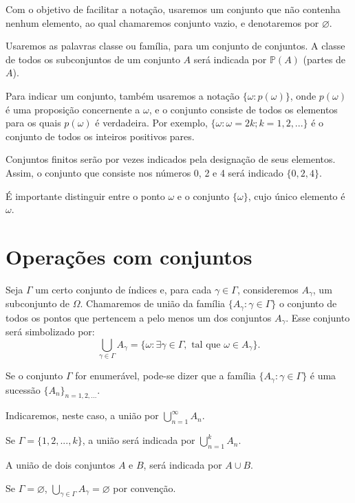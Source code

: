 \documentclass[
]{book}
\begin{document}
Com o objetivo de facilitar a notação, usaremos um conjunto que não contenha nenhum elemento, ao qual chamaremos conjunto vazio, e denotaremos por \(\varnothing\).

Usaremos as palavras classe ou família, para um conjunto de conjuntos.
A classe de todos os subconjuntos de um conjunto \(A\) será indicada por \(\mathbb{P}(A)\) (partes de \(A\)).

Para indicar um conjunto, também usaremos a notação \(\{\omega: p(\omega)\}\), onde \(p(\omega)\) é uma proposição concernente a \(\omega\), e o conjunto consiste de todos os elementos para os quais \(p(\omega)\) é verdadeira.
Por exemplo, \(\{\omega: \omega = 2k; k=1, 2, ...\}\) é o conjunto de todos os inteiros positivos pares.

Conjuntos finitos serão por vezes indicados pela designação de seus elementos.
Assim, o conjunto que consiste nos números 0, 2 e 4 será indicado \(\{0, 2, 4\}\).

É importante distinguir entre o ponto \(\omega\) e o conjunto \(\{\omega\}\), cujo único elemento é \(\omega\).

\section{Operações com conjuntos}\label{operauxe7uxf5es-com-conjuntos}

Seja \(\Gamma\) um certo conjunto de índices e, para cada \(\gamma \in \Gamma\), consideremos \(A_{\gamma}\), um subconjunto de \(\Omega\).
Chamaremos de união da família \(\{A_{\gamma}: \gamma \in \Gamma\}\) o conjunto de todos os pontos que pertencem a pelo menos um dos conjuntos \(A_{\gamma}\).
Esse conjunto será simbolizado por: \[ \bigcup_{\gamma \in \Gamma} A_{\gamma} = \{\omega: \exists \gamma \in \Gamma, \text{ tal que } \omega \in A_{\gamma}\}. \]

Se o conjunto \(\Gamma\) for enumerável, pode-se dizer que a família \(\{A_{\gamma}: \gamma \in \Gamma\}\) é uma sucessão \(\{A_n\}_{n=1,2,...}\).

Indicaremos, neste caso, a união por \(\bigcup\limits_{n=1}^{\infty} A_n\).

Se \(\Gamma = \{1, 2, ..., k\}\), a união será indicada por \(\bigcup\limits_{n=1}^{k} A_n\).

A união de dois conjuntos \(A\) e \(B\), será indicada por \(A \cup B\).

Se \(\Gamma = \varnothing\), \(\bigcup\limits_{\gamma \in \Gamma} A_{\gamma} = \varnothing\) por convenção.
\end{document}
